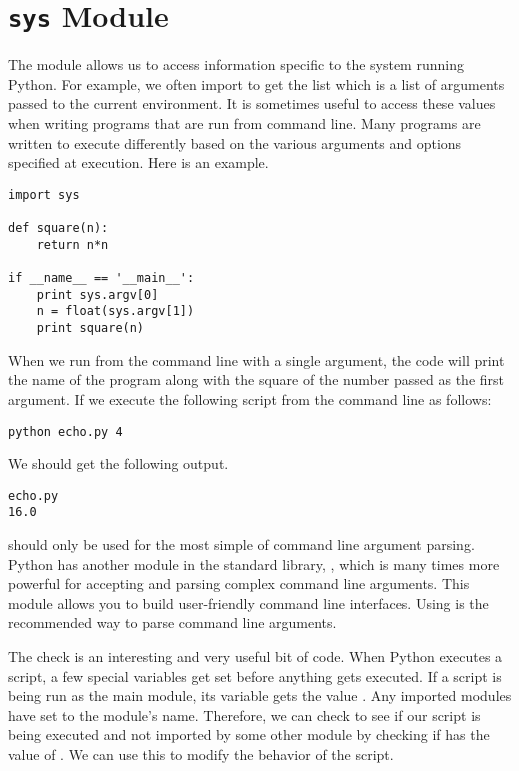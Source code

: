 \section*{\texttt{sys} Module}
The  module allows us to access information specific to the system running Python.
For example, we often import  to get the list  which is a list of arguments passed to the current environment.
It is sometimes useful to access these values when writing programs that are run from command line.
Many programs are written to execute differently based on the various arguments and options specified at execution.
Here is an example.
\begin{lstlisting}
import sys

def square(n):
    return n*n
        
if __name__ == '__main__':
    print sys.argv[0]
    n = float(sys.argv[1])
    print square(n)
\end{lstlisting}
When we run from the command line with a single argument, the code will print the name of the program along with the square of the number passed as the first argument.
If we execute the following script from the command line as follows:
\begin{lstlisting}[style=ShellInput]
python echo.py 4
\end{lstlisting}
We should get the following output.
\begin{lstlisting}[style=ShellOutput]
echo.py
16.0
\end{lstlisting}

\begin{info}
 should only be used for the most simple of command line argument parsing.
Python has another module in the standard library, , which is many times more powerful for accepting and parsing complex command line arguments.  This module allows you to build user-friendly command line interfaces.  Using  is the recommended way to parse command line arguments.
\end{info}

The check  is an interesting and very useful bit of code.
When Python executes a script, a few special variables get set before anything gets executed.
If a script is being run as the main module, its  variable gets the value .  Any imported modules have  set to the module's name.
Therefore, we can check to see if our script is being executed and not imported by some other module by checking if  has the value of .  We can use this to modify the behavior of the script.

